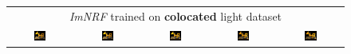 \begingroup
\begin{figure}[!htb]
    \centering
    \setlength\tabcolsep{0pt}
    \begin{tabular*}{\textwidth}{ c c c c c }
        \multicolumn{5}{c}{\textit{ImNRF} trained on \textbf{colocated} light dataset} \\
          \includegraphics[width=0.2\textwidth]{figures/results/arb_set/dynamic_light/imnf_coloc_vc0_ld-90.png}
        & \includegraphics[width=0.2\textwidth]{figures/results/arb_set/dynamic_light/imnf_coloc_vc0_ld-60.png}
        & \includegraphics[width=0.2\textwidth]{figures/results/arb_set/dynamic_light/imnf_coloc_vc0_ld0.png}
        & \includegraphics[width=0.2\textwidth]{figures/results/arb_set/dynamic_light/imnf_coloc_vc0_ld60.png} 
        & \includegraphics[width=0.2\textwidth]{figures/results/arb_set/dynamic_light/imnf_coloc_vc0_ld90.png} \\
        
        

\end{tabular*}
\end{figure}
